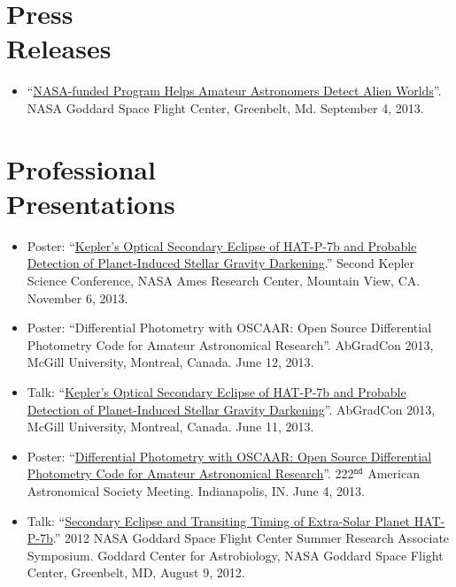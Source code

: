 \documentclass[margin]{res}
\begin{document}
\begin{resume}
\section{Press\\Releases} 
                 \begin{itemize}
                 \item ``\href{http://www.nasa.gov/content/nasa-funded-program-helps-amateur-astronomers-detect-alien-worlds/}{NASA-funded Program Helps Amateur Astronomers Detect Alien Worlds}''. NASA Goddard Space Flight Center, Greenbelt, Md. September 4, 2013. \\
                 \end{itemize}              

\section{Professional\\ Presentations} 
                 \begin{itemize}  %
                 \item Poster: ``\href{http://nexsci.caltech.edu/conferences/KeplerII/posters/morris.pdf}{Kepler's Optical Secondary Eclipse of HAT-P-7b and Probable Detection of Planet-Induced Stellar Gravity Darkening}.'' Second Kepler Science Conference, NASA Ames Research Center, Mountain View, CA. November 6, 2013. 
                 \item Poster: ``Differential Photometry with OSCAAR: Open Source Differential Photometry Code for Amateur Astronomical Research''. AbGradCon 2013, McGill University, Montreal, Canada. June 12, 2013.
                 \item Talk: ``\href{http://youtu.be/ZMfbkCzzQUE}{Kepler's Optical Secondary Eclipse of HAT-P-7b and Probable Detection of Planet-Induced Stellar Gravity Darkening}''. AbGradCon 2013, McGill University, Montreal, Canada. June 11, 2013.
                 \item Poster: ``\href{http://adsabs.harvard.edu/abs/2013AAS...22221717M}{Differential Photometry with OSCAAR: Open Source Differential Photometry Code for Amateur Astronomical Research}''. 222$^\mathtt{nd}$ American Astronomical Society Meeting. Indianapolis, IN. June 4, 2013.
                 \item Talk: ``\href{https://astrobiology.nasa.gov/seminars/featured-seminar-channels/gsfc-summer-internship/2012/08/09/gsfc-summer-research-associate-presentations/}{Secondary Eclipse and Transiting Timing of Extra-Solar Planet HAT-P-7b}.'' 2012 NASA Goddard Space Flight Center Summer Research Associate Symposium. Goddard Center for Astrobiology, NASA Goddard Space Flight Center, Greenbelt, MD, August 9, 2012.

\end{itemize}
\end{resume}
\end{document}
